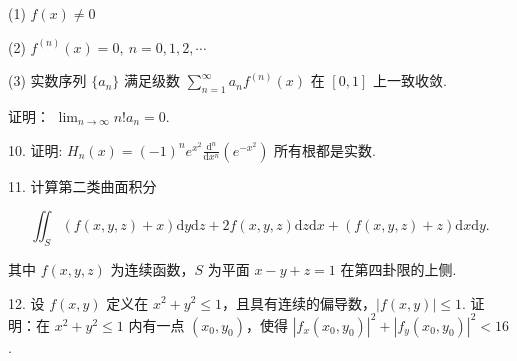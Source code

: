 \documentclass{examcollection}
\renewcommand{\displayformula}[1]{\[#1\]}
\begin{document}
{\begin{minipage}{\textwidth}
(1) $f(x)\neq 0$\par
(2)  $f^{(n)}(x)=0,\ n=0,1,2,\cdots$\par
(3) 实数序列 $\{a_{n}\}$ 满足级数 $\sum_{n=1}^{\infty} a_{n} f^{(n)}(x)$ 在 $[0,1]$ 上一致收敛.\par
证明： $\lim_{n\to \infty}n!a_n = 0.$\par
10. 证明: $H_{n}(x) = (-1)^{n} e^{x^{2}} \frac{\mathrm{d}^{n}}{\mathrm{d} x^{n}} (e^{-x^{2}})$ 所有根都是实数.\par
11. 计算第二类曲面积分\par
\displayformula{\iint_ {S} (f (x, y, z) + x) \mathrm{d} y \mathrm{d} z + 2 f (x, y, z) \mathrm{d} z \mathrm{d} x + (f (x, y, z) + z) \mathrm{d} x \mathrm{d} y.}\par
其中 $f(x,y,z)$ 为连续函数，$S$ 为平面 $x - y + z = 1$ 在第四卦限的上侧.\par
12. 设 $f(x, y)$ 定义在 $x^2 + y^2 \leq 1$，且具有连续的偏导数，$|f(x, y)| \leq 1$. 证明：在 $x^2 + y^2 \leq 1$ 内有一点 $(x_0, y_0)$，使得 $|f_x(x_0, y_0)|^2 + |f_y(x_0, y_0)|^2 < 16$.\par
\end{minipage}}
\ifdim\dimexpr\ht\proofbox+\dp\proofbox\relax>\textheight
\noindent\resizebox{!}{\textheight}{\usebox{\proofbox}}\else\noindent\usebox{\proofbox}\fi\clearpage
\end{document}

